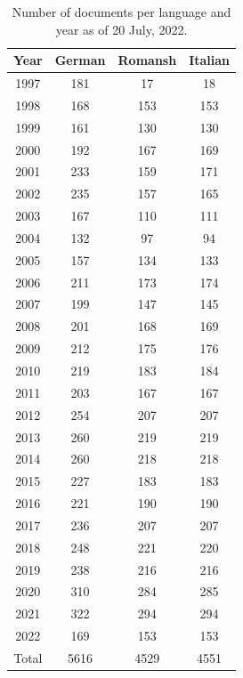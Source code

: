 \begin{table}
\centering
\begin{tabular}{cccc}
\toprule
Year & German & Romansh & Italian\\
\midrule
1997 & 181 & 17 & 18\\ 
1998 & 168 & 153 & 153\\ 
1999 & 161 & 130 & 130\\ 
2000 & 192 & 167 & 169\\ 
2001 & 233 & 159 & 171\\ 
2002 & 235 & 157 & 165\\ 
2003 & 167 & 110 & 111\\ 
2004 & 132 & 97 & 94\\ 
2005 & 157 & 134 & 133\\ 
2006 & 211 & 173 & 174\\ 
2007 & 199 & 147 & 145\\ 
2008 & 201 & 168 & 169\\ 
2009 & 212 & 175 & 176\\ 
2010 & 219 & 183 & 184\\ 
2011 & 203 & 167 & 167\\ 
2012 & 254 & 207 & 207\\ 
2013 & 260 & 219 & 219\\ 
2014 & 260 & 218 & 218\\ 
2015 & 227 & 183 & 183\\ 
2016 & 221 & 190 & 190\\ 
2017 & 236 & 207 & 207\\ 
2018 & 248 & 221 & 220\\ 
2019 & 238 & 216 & 216\\ 
2020 & 310 & 284 & 285\\ 
2021 & 322 & 294 & 294\\ 
2022 & 169 & 153 & 153\\
\midrule
Total & 5616	&4529&	4551\\
\bottomrule
\end{tabular}
\caption{Number of documents per language and year as of 20 July, 2022.}
\label{tab:docs-per-lang}
\end{table}


